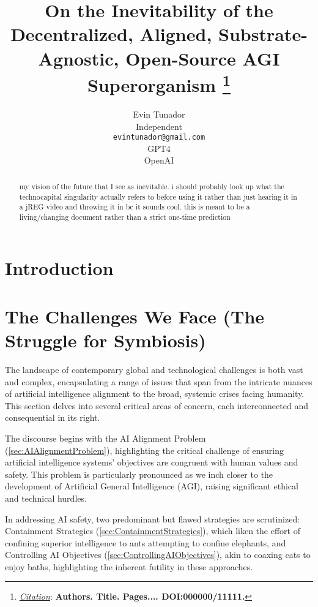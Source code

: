 \documentclass{article}
\title{On the Inevitability of the Decentralized, Aligned, Substrate-Agnostic, Open-Source AGI Superorganism
\thanks{\textit{\underline{Citation}}: 
\textbf{Authors. Title. Pages.... DOI:000000/11111.}} 
}
\author{
  Evin Tunador \\
  Independent \\
  \texttt{evintunador@gmail.com} \\
  \And
  GPT4 \\
  OpenAI \\
}
\begin{document}
\maketitle


\begin{abstract}
my vision of the future that I see as inevitable. i should probably look up what the technocapital singularity actually refers to before using it rather than just hearing it in a jREG video and throwing it in bc it sounds cool. this is meant to be a living/changing document rather than a strict one-time prediction
\end{abstract}



\tableofcontents

\section{Introduction}
\label{sec:intro}





\section{The Challenges We Face (The Struggle for Symbiosis)}
\label{sec:Problems}

The landscape of contemporary global and technological challenges is both vast and complex, encapsulating a range of issues that span from the intricate nuances of artificial intelligence alignment to the broad, systemic crises facing humanity. This section delves into several critical areas of concern, each interconnected and consequential in its right.

The discourse begins with the AI Alignment Problem (\ref{sec:AIAlignmentProblem}), highlighting the critical challenge of ensuring artificial intelligence systems' objectives are congruent with human values and safety. This problem is particularly pronounced as we inch closer to the development of Artificial General Intelligence (AGI), raising significant ethical and technical hurdles.

In addressing AI safety, two predominant but flawed strategies are scrutinized: Containment Strategies (\ref{sec:ContainmentStrategies}), which liken the effort of confining superior intelligence to ants attempting to confine elephants, and Controlling AI Objectives (\ref{sec:ControllingAIObjectives}), akin to coaxing cats to enjoy baths, highlighting the inherent futility in these approaches.
\end{document}
